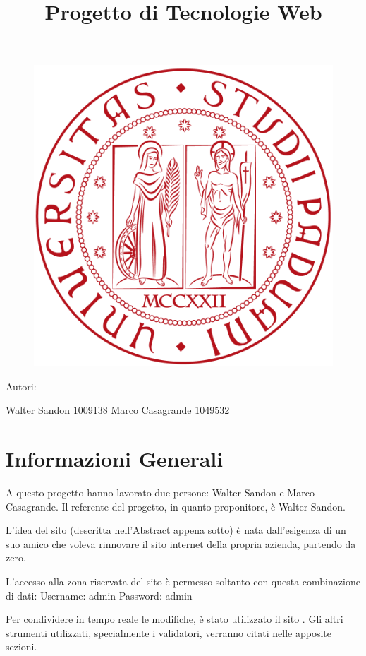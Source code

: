 \documentclass[11pt]{article}
\title{Progetto di Tecnologie Web}
\begin{document}
	\maketitle
	\begin{figure}[h]
		\centering
		\includegraphics[width=0.7\linewidth]{logo-unipd.png}
	\end{figure}
	\begin{center}{\fontsize{20}{10}\selectfont Autori:}\end{center}
	\begin{center}{\fontsize{20}{30}\selectfont 
			Walter Sandon 1009138
			Marco Casagrande 1049532
			}\end{center}
	
	\newpage
	\tableofcontents
	\newpage
	\listoffigures
	\newpage
	
\section{Informazioni Generali}

A questo progetto hanno lavorato due persone: Walter Sandon e Marco Casagrande.
Il referente del progetto, in quanto proponitore, è Walter Sandon.

L'idea del sito (descritta nell'Abstract appena sotto) è nata dall'esigenza di un suo amico che voleva rinnovare il sito internet della propria azienda, partendo da zero.

L'accesso alla zona riservata del sito è permesso soltanto con questa combinazione di dati:
Username: admin
Password: admin

Per condividere in tempo reale le modifiche, è stato utilizzato il sito \href{https://github.com/}.
Gli altri strumenti utilizzati, specialmente i validatori, verranno citati nelle apposite sezioni.
\end{document}
